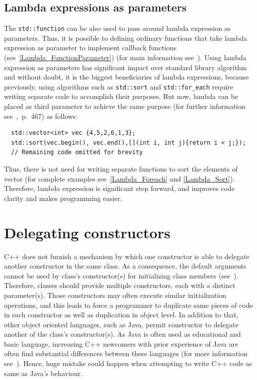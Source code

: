 \documentclass[11pt]{report}
\begin{document}
\subsection{Lambda expressions as parameters}
\label{subsection: Lambda Expressions as Parameters}
The \texttt{std::function} can be also used to pass around lambda expression as parameters. Thus, it is possible to defining ordinary functions that take lambda expression as parameter to implement callback functions (see~\ref{Lambda_FunctionParameter}) (for main information see~\cite{Allain:2011:FutureCpp}). Using lambda expression as parameters has significant impact over standard library algorithm and without doubt, it is the biggest beneficiaries of lambda expressions, because previously, using algorithms such as \texttt{std::sort} and \texttt{std::for\_each} require writing separate code to accomplish their purposes. But now, lambda can be placed as third parameter to achieve the same purpose (for further information see~\cite{Gregorie:professionalcpp},~p.~467) as follows:
\begin{lstlisting}
  std::vector<int> vec {4,5,2,6,1,3};
  std::sort(vec.begin(), vec.end(),[](int i, int j){return i < j;});
  // Remaining code omitted for brevity
\end{lstlisting}
Thus, there is not need for writing separate functions to sort the elements of vector (for complete examples see~\ref{Lambda_Foreach} and \ref{Lambda_Sort}). Therefore, lambda expression is significant step forward, and improves code clarity and makes programming easier.

\section{Delegating constructors}
\label{section: Delegating constructors}
C++ does not furnish a mechanism by which one constructor is able to delegate another constructor in the same class.  As a consequence, the default arguments cannot be used by class's constructor(s) for initializing class members (see~\cite{Stroustrup:2012:Cpp11}). Therefore, classes should provide multiple constructors, each with a distinct parameter(s). Those constructors may often execute similar initialization operations, and this leads to force a programmer to duplicate same pieces of code in each constructor as well as duplication in object level. In addition to that, other object oriented languages, such as Java, permit constructor to delegate another of the class's constructor(s). As Java is often used as educational and basic language, increasing C++ newcomers with prior experience of Java are often find substantial differences between these languages (for more information see~\cite{Stroustrup:2012:Cpp11}). Hence, huge mistake could happen when attempting to write C++ code as same as Java's behaviour.
\end{document}
